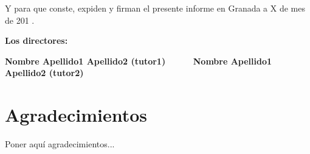 Y para que conste, expiden y firman el presente informe en Granada a X de mes de 201 .

\vspace{1cm}

\textbf{Los directores:}

\vspace{5cm}

\noindent \textbf{Nombre Apellido1 Apellido2 (tutor1) \ \ \ \ \ Nombre Apellido1 Apellido2 (tutor2)}

\chapter*{Agradecimientos}
\thispagestyle{empty}

       \vspace{1cm}


Poner aquí agradecimientos...

